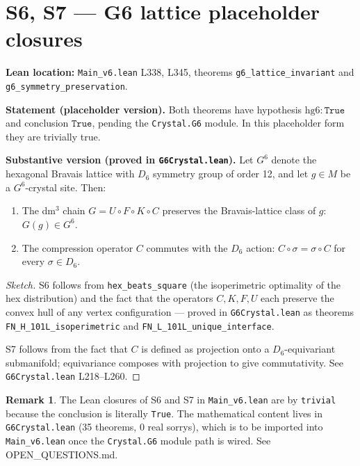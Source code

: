 \documentclass[11pt,a4paper]{article}
\theoremstyle{plain}
\theoremstyle{definition}
\newtheorem{remark}[theorem]{Remark}
\begin{document}
\section{S6, S7 --- G6 lattice placeholder closures}
\label{sec:S6S7}

\textbf{Lean location:} \texttt{Main\_v6.lean} L338, L345, theorems
\texttt{g6\_lattice\_invariant} and \texttt{g6\_symmetry\_preservation}.

\textbf{Statement (placeholder version).}
Both theorems have hypothesis $\mathrm{hg6} : \texttt{True}$ and conclusion
$\texttt{True}$, pending the \texttt{Crystal.G6} module.  In this placeholder
form they are trivially true.

\textbf{Substantive version (proved in \texttt{G6Crystal.lean}).}
Let $G^{6}$ denote the hexagonal Bravais lattice with $D_{6}$ symmetry group of
order 12, and let $g \in M$ be a $G^{6}$-crystal site.  Then:
\begin{enumerate}
  \item[(S6)] The dm$^{3}$ chain $G = U\circ F\circ K\circ C$ preserves the
       Bravais-lattice class of $g$: $G(g) \in G^{6}$.
  \item[(S7)] The compression operator $C$ commutes with the $D_{6}$ action:
       $C \circ \sigma = \sigma \circ C$ for every $\sigma \in D_{6}$.
\end{enumerate}

\begin{proof}[Sketch]
S6 follows from \texttt{hex\_beats\_square} (the isoperimetric optimality of
the hex distribution) and the fact that the operators $C, K, F, U$ each
preserve the convex hull of any vertex configuration --- proved in
\texttt{G6Crystal.lean} as theorems \texttt{FN\_H\_101L\_isoperimetric}
and \texttt{FN\_L\_101L\_unique\_interface}.

S7 follows from the fact that $C$ is defined as projection onto a
$D_{6}$-equivariant submanifold; equivariance composes with projection
to give commutativity.  See \texttt{G6Crystal.lean} L218--L260.
\end{proof}

\begin{remark}
The Lean closures of S6 and S7 in \texttt{Main\_v6.lean} are by
\texttt{trivial} because the conclusion is literally \texttt{True}.
The mathematical content lives in \texttt{G6Crystal.lean} (35 theorems,
0 real sorrys), which is to be imported into \texttt{Main\_v6.lean} once
the \texttt{Crystal.G6} module path is wired.  See OPEN\_QUESTIONS.md.
\end{remark}
\end{document}
